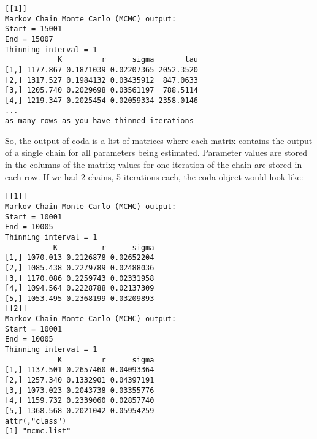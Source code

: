 \documentclass[12pt,english]{article}
\begin{document}
\begin{Verbatim}[fontsize=\small]
[[1]]
Markov Chain Monte Carlo (MCMC) output:
Start = 15001
End = 15007
Thinning interval = 1
            K         r      sigma       tau
[1,] 1177.867 0.1871039 0.02207365 2052.3520
[2,] 1317.527 0.1984132 0.03435912  847.0633
[3,] 1205.740 0.2029698 0.03561197  788.5114
[4,] 1219.347 0.2025454 0.02059334 2358.0146
...
as many rows as you have thinned iterations
\end{Verbatim}

\noindent So, the output of coda is a list of matrices where each matrix contains the output of a single chain for all parameters being estimated. Parameter values are stored in the columns of the matrix; values for one iteration of the chain are stored in each row. If we had 2 chains, 5 iterations each, the coda object would look like:

\begin{Verbatim}[fontsize=\small]
[[1]]
Markov Chain Monte Carlo (MCMC) output:
Start = 10001
End = 10005
Thinning interval = 1
           K          r      sigma
[1,] 1070.013 0.2126878 0.02652204
[2,] 1085.438 0.2279789 0.02488036
[3,] 1170.086 0.2259743 0.02331958
[4,] 1094.564 0.2228788 0.02137309
[5,] 1053.495 0.2368199 0.03209893
[[2]]
Markov Chain Monte Carlo (MCMC) output:
Start = 10001
End = 10005
Thinning interval = 1
            K         r      sigma
[1,] 1137.501 0.2657460 0.04093364
[2,] 1257.340 0.1332901 0.04397191
[3,] 1073.023 0.2043738 0.03355776
[4,] 1159.732 0.2339060 0.02857740
[5,] 1368.568 0.2021042 0.05954259
attr(,"class")
[1] "mcmc.list"
\end{Verbatim}
\end{document}
